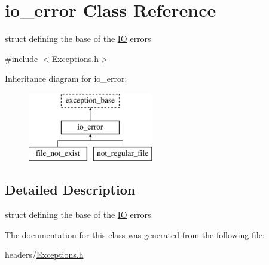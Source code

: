 \hypertarget{structio__error}{\section{io\-\_\-error \-Class \-Reference}
\label{structio__error}
}


struct defining the base of the \hyperlink{class_i_o}{\-I\-O} errors  




{\ttfamily \#include $<$\-Exceptions.\-h$>$}

\-Inheritance diagram for io\-\_\-error\-:\begin{figure}[H]
\begin{center}
\leavevmode
\includegraphics[height=3.000000cm]{structio__error}
\end{center}
\end{figure}


\subsection{\-Detailed \-Description}
struct defining the base of the \hyperlink{class_i_o}{\-I\-O} errors 

\-The documentation for this class was generated from the following file\-:\begin{DoxyCompactItemize}
\item 
headers/\hyperlink{_exceptions_8h}{\-Exceptions.\-h}\end{DoxyCompactItemize}
